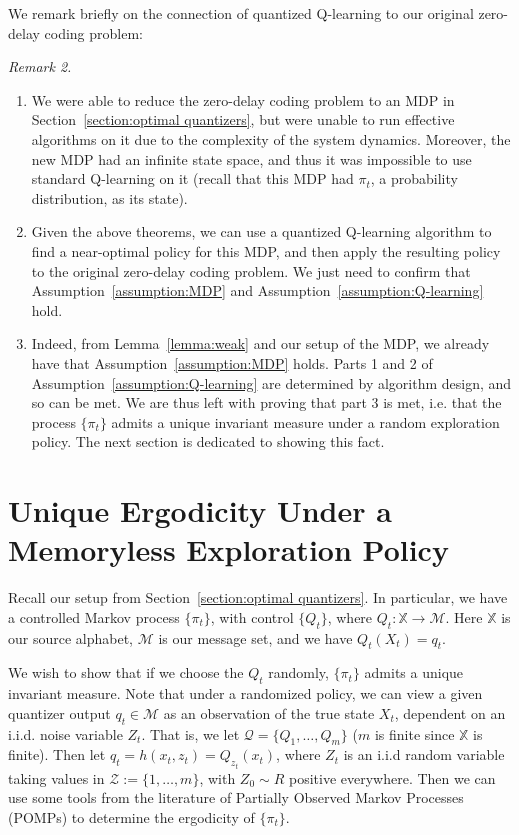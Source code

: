 \documentclass[conference]{IEEEtran}
\begin{document}
We remark briefly on the connection of quantized Q-learning to our original zero-delay coding problem:

\vspace{1em}
\noindent\emph{Remark 2.}\label{remark:2}
\begin{enumerate}[wide, labelwidth=!, labelindent=0pt]
    \item We were able to reduce the zero-delay coding problem to an MDP in Section~\ref{section:optimal quantizers}, but were unable to run effective algorithms on it due to the complexity of the system dynamics. Moreover, the new MDP had an infinite state space, and thus it was impossible to use standard Q-learning on it (recall that this MDP had \(\pi_t\), a probability distribution, as its state).
    \item Given the above theorems, we can use a quantized Q-learning algorithm to find a near-optimal policy for this MDP, and then apply the resulting policy to the original zero-delay coding problem. We just need to confirm that Assumption~\ref{assumption:MDP} and Assumption~\ref{assumption:Q-learning} hold.
    \item Indeed, from Lemma~\ref{lemma:weak} and our setup of the MDP, we already have that Assumption~\ref{assumption:MDP} holds. Parts 1 and 2 of Assumption~\ref{assumption:Q-learning} are determined by algorithm design, and so can be met. We are thus left with proving that part 3 is met, i.e. that the process \(\{\pi_t\}\) admits a unique invariant measure under a random exploration policy. The next section is dedicated to showing this fact.
\end{enumerate}

\section{Unique Ergodicity Under a Memoryless Exploration Policy}\label{section:unique-ergodicity}
Recall our setup from Section~\ref{section:optimal quantizers}. In particular, we have a controlled Markov process \(\{\pi_t\}\), with control \(\{Q_t\}\), where \(Q_t : \mathbb{X} \to \mathcal{M}\). Here \(\mathbb{X}\) is our source alphabet, \(\mathcal{M}\) is our message set, and we have \(Q_t(X_t) = q_t\).

We wish to show that if we choose the \(Q_t\) randomly, \( \{\pi_t\} \) admits a unique invariant measure. Note that under a randomized policy, we can view a given quantizer output \(q_t \in \mathcal{M}\) as an observation of the true state \( X_t \), dependent on an i.i.d. noise variable \( Z_t\). That is, we let \(\mathcal{Q} = \{Q_1,\ldots,Q_m\} \) (\( m \) is finite since \( \mathbb{X} \) is finite). Then let \( q_t = h(x_t,z_t) = Q_{z_t}(x_t) \), where \( Z_t \) is an i.i.d random variable taking values in \( \mathcal{Z} := \{1,\ldots,m\} \), with \(Z_0 \sim R\) positive everywhere. Then we can use some tools from the literature of Partially Observed Markov Processes (POMPs) to determine the ergodicity of \( \{\pi_t\} \).
\end{document}
